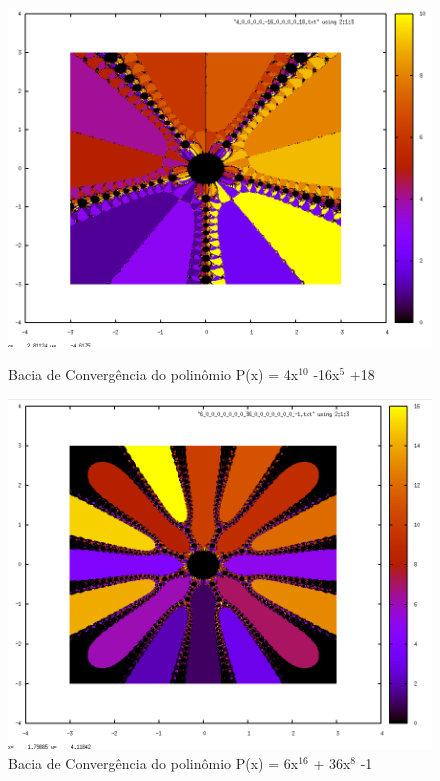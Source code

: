 \documentclass[11pt]{article}
\newcommand{\vsp}{\vspace{0.2in}}
\begin{document}
\begin{figure}[h!]
  \begin{center}
    \includegraphics[scale=0.42]{5}
    \caption{Bacia de Convergência do polinômio P(x) = 4x$^{10}$ -16x$^5$ +18}
    \vsp\vsp
    \includegraphics[scale=0.42]{6}
    \caption{Bacia de Convergência do polinômio P(x) = 6x$^{16}$ + 36x$^8$ -1}
  \end{center}
\end{figure}
\end{document}
